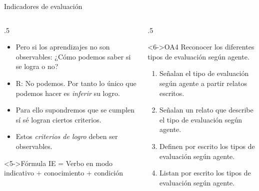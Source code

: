 \documentclass[11pt, aspectratio=169, xcolor=table,hyphens]{beamer}
\begin{document}
\begin{frame}{Indicadores de evaluación}
	\begin{columns}
		\begin{column}{.5\linewidth}
			\begin{itemize}[<+->]
				\justifying
				\item Pero si los aprendizajes no son observables: ¿Cómo podemos saber si se logra o no?
				\item R: No podemos. Por tanto lo único que podemos hacer es \textit{inferir} su logro.
				\item Para ello supondremos que se cumplen sí sé logran ciertos criterios.
				\item Estos \textit{criterios de logro} deben ser observables.
			\end{itemize}
			\begin{block}<5->{Fórmula}
				IE = {\color{red}Verbo en modo indicativo} + {\color{cyan}conocimiento} + {\color{blue}condición}
			\end{block}
		\end{column}
		\begin{column}{.5\linewidth}
			\begin{block}<6->{OA4}
				{\color{red}Reconocer} los diferentes {\color{blue}tipos de evaluación según agente}.
				\begin{enumerate}
					\item<7-> {\color{red}Señalan} el {\color{cyan}tipo de evaluación según agente} {\color{blue}a partir relatos escritos}.
					\item<8-> {\color{red}Señalan} {\color{blue}un relato que describe} el {\color{cyan}tipo de evaluación según agente}.
					\item<9-> {\color{red}Definen} {\color{blue}por escrito} los {\color{cyan}tipos de evaluación según agente}.
					\item<10-> {\color{red}Listan} {\color{blue}por escrito} los {\color{cyan}tipos de evaluación según agente}.
				\end{enumerate}
			\end{block}
		\end{column}
	\end{columns}
\end{frame}
\end{document}
